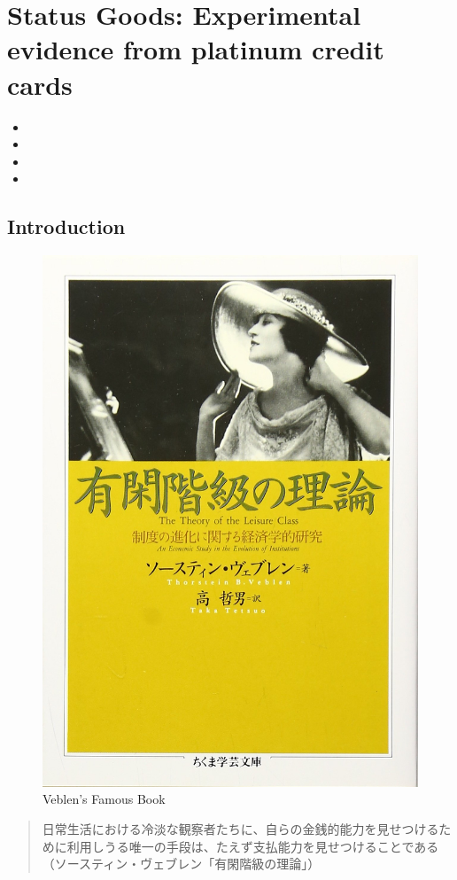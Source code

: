 \documentclass[../root]{subfiles}
\begin{document}
    \chapter{Status Goods: Experimental evidence from platinum credit cards}

    \begin{shortsummary}
        \begin{itemize}
            \item {}
            \item {}
            \item {}
            \item {}
        \end{itemize}
    \end{shortsummary}

    \section{Introduction}

    \begin{figure}[h]
        \centering
        \includegraphics[width = 0.5\linewidth]{0717kato/veblen.jpg}
        \caption{Veblen's Famous Book}
        \label{veblen}
    \end{figure}

    \begin{quote}
        日常生活における冷淡な観察者たちに、自らの金銭的能力を見せつけるために利用しうる唯一の手段は、たえず支払能力を見せつけることである（ソースティン・ヴェブレン「有閑階級の理論」）
    \end{quote}
\end{document}
